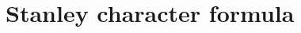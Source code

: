 \documentclass[12pt]{amsart}
\theoremstyle{plain}
\newtheorem{theorem}[lemma]{Theorem}
\theoremstyle{remark}
\begin{document}
 \section{Stanley character formula}
 \label{sec:stanley-feray}
% 
% 
% 
% 
% 
% 
% 
\end{document}

